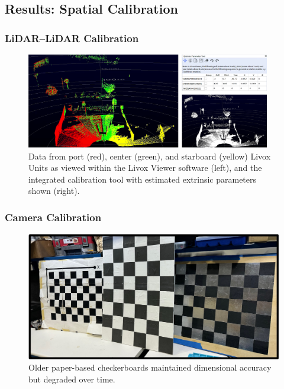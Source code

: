 \documentclass{erauthesis}
\begin{document}
\subsection{Results: Spatial Calibration} \label{sec:spatial_calib_results}
\subsubsection{LiDAR–LiDAR Calibration} \label{results_lidarLidar_calib}


\begin{figure}[ht]
\centering
        \includegraphics[width=0.95\textwidth]{Images/livox_viewer.png} 
\caption{Data from port (red), center (green), and starboard (yellow) Livox Units as viewed within the Livox Viewer software (left), and the integrated calibration tool with estimated extrinsic parameters shown (right). }
\label{fig:LidarLidar_calib}
\end{figure}

\subsubsection{Camera Calibration} \label{sec:camera_intriniscs_results}


\begin{figure}[htbp]
    \centering
    \includegraphics[width=0.9\linewidth]{Images/checkerboard_old.jpg}
    \caption{Older paper-based checkerboards maintained dimensional accuracy but degraded over time.}
    \label{fig:checkerboard_old}
\end{figure}
\end{document}
